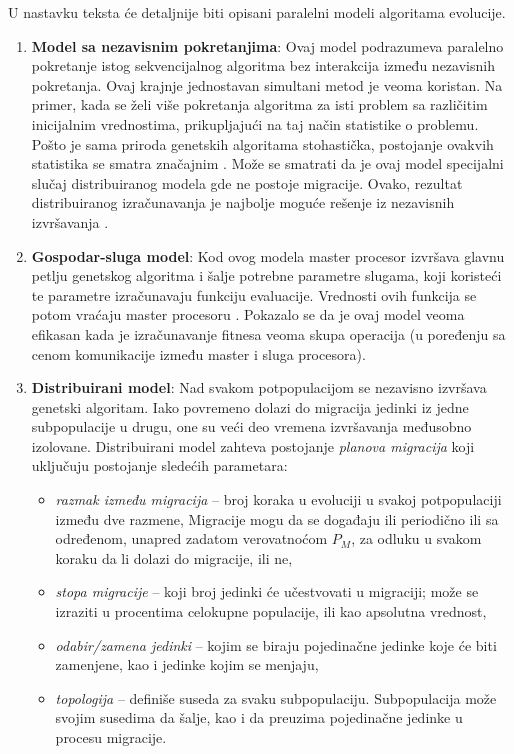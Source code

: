 \documentclass[a4paper]{article}
\begin{document}
U nastavku teksta će detaljnije biti opisani paralelni modeli algoritama evolucije.

\begin{enumerate}
    \item \textbf{Model sa nezavisnim pokretanjima}: \newline \indent \indent Ovaj model podrazumeva paralelno pokretanje istog sekvencijalnog algoritma bez interakcija između nezavisnih pokretanja. Ovaj krajnje jednostavan simultani metod je veoma koristan. Na primer, kada se želi više pokretanja algoritma za isti problem sa različitim inicijalnim vrednostima, prikupljajući na taj način statistike o problemu. Pošto je sama priroda genetskih algoritama stohastička, postojanje ovakvih statistika se smatra značajnim \cite{alba}.
    \newline
    Može se smatrati da je ovaj model specijalni slučaj distribuiranog modela gde ne postoje migracije. Ovako, rezultat distribuiranog izračunavanja je najbolje moguće rešenje iz nezavisnih izvršavanja \cite{alba}. 
    \item \textbf{Gospodar-sluga model}: \newline \indent Kod ovog modela master procesor izvršava glavnu petlju genetskog algoritma i šalje potrebne parametre slugama, koji koristeći te parametre izračunavaju funkciju evaluacije. Vrednosti ovih funkcija se potom vraćaju master procesoru \cite{alba}.
    \indent Pokazalo se da je ovaj model veoma efikasan kada je izračunavanje fitnesa veoma skupa operacija (u poređenju sa cenom komunikacije između master i sluga procesora).
    \item \textbf{Distribuirani model}: \newline \indent Nad svakom potpopulacijom se nezavisno izvršava genetski algoritam. Iako povremeno dolazi do migracija jedinki iz jedne subpopulacije u drugu, one su veći deo vremena izvršavanja međusobno izolovane. Distribuirani model zahteva postojanje \textit{planova migracija} koji uključuju postojanje sledećih parametara: \cite{alba}
    \begin{itemize}
        \item \textit{razmak između migracija} -- broj koraka u evoluciji u svakoj potpopulaciji između dve razmene, Migracije mogu da se događaju ili periodično ili sa određenom, unapred zadatom verovatnoćom $P_M$, za odluku u svakom koraku da li dolazi do migracije, ili ne,
        \item \textit{stopa migracije} -- koji broj jedinki će učestvovati u migraciji; može se izraziti u procentima celokupne populacije, ili kao apsolutna vrednost,
        \item \textit{odabir/zamena jedinki} -- kojim se biraju pojedinačne jedinke koje će biti zamenjene, kao i jedinke kojim se menjaju,
        \item \textit{topologija} -- definiše suseda za svaku subpopulaciju. Subpopulacija može svojim susedima da šalje, kao i da preuzima pojedinačne jedinke u procesu migracije.  
    \end{itemize}{}
\end{enumerate}{}
\end{document}
